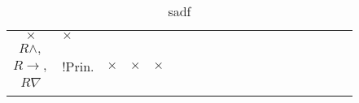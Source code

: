 \begin{table}
\begin{tabular}{|c|p{.2cm}|*{17}{p{.4cm}|}}
		\multirow{2}{*}{$\times$} &
		\multirow{2}{*}{$\times$} \\
		$R \lor_2,$ & & & & & & & & & & \caseref{c:ro2-lo} & & & & & & & &\\
		\cline{2-19}
		$R \land,$ & \multirow{3}{*}{\tiny !Prin.} &
		\multirow{3}{*}{$\times$} &
		\multirow{3}{*}{$\times$} &
		\multirow{3}{*}{$\times$} &
		\multirow{3}{*}{\caseref{c:*-lw}} &
		\multirow{3}{*}{\caseref{c:*-lc}} &
		\multirow{3}{*}{\caseref{c:*-cut}} &
		\multirow{3}{*}{\caseref{c:*-la1}} &
		\multirow{3}{*}{\caseref{c:*-la2}} &
		\multirow{3}{*}{\caseref{c:*-lo}} &
		\multirow{3}{*}{\caseref{c:*-ln}} &
		\multirow{3}{*}{\caseref{c:*-li}} &
		\multirow{3}{*}{\caseref{c:*-rw}} &
		\multirow{3}{*}{\caseref{c:*-ra}} &
		\multirow{3}{*}{\caseref{c:*-ro1}} &
		\multirow{3}{*}{\caseref{c:*-ro2}} &
		\multirow{3}{*}{\caseref{c:*-ri}} &
		\multirow{3}{*}{\caseref{c:*-rn}} \\
		$R \rightarrow,$ & & & & & & & & & & & & & & & & & & \\
		$R \nabla$ & & & & & & & & & & & & & & & & & & \\
		\hline
		\multicolumn{2}{|c|}{\slashbox[2.3cm]{$\mathbf{D_0}$}{$\mathbf{D_1}$}} & \rot{$Id$} & \rot{$Ta$} & \rot{$Ex$} & \rot{$Lw$} & \rot{$Lc$} & \rot{$\nabla Cut$} & \rot{$L \land_1$} & \rot{$L \land_2$} & \rot{$L \lor$} & \rot{$L \nabla$} & \rot{$L \rightarrow$} & \rot{$Rw$} & \rot{$R \land$} & \rot{$R \lor_1$} & \rot{$R \lor_2$} & \rot{$R \rightarrow$} & \rot{$R \nabla$} \\
		\hline
	\end{tabular}
	\caption{sadf}
\end{table}